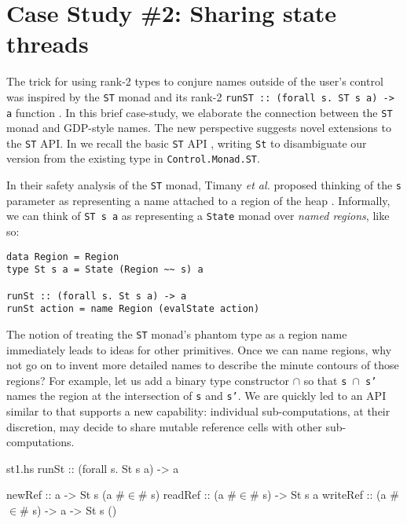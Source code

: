 \documentclass[format=sigplan, review=false, screen=true]{acmart}
\begin{document}

\section{Case Study \#2: Sharing state threads}
The trick for using rank-2 types to conjure names outside of the user's control was
inspired by the \texttt{ST} monad and its rank-2 \texttt{runST :: (forall s. ST s a) -> a}
function \cite{launchbury1994lazy}. In this brief case-study, we elaborate the connection
between the \texttt{ST} monad and GDP-style names. The new perspective suggests novel
extensions to the \texttt{ST} API.
In  we recall the basic \texttt{ST} API \cite{launchbury1994lazy}, writing \texttt{St} to
disambiguate our version from the existing type in \texttt{Control.Monad.ST}.

In their safety analysis of the \texttt{ST} monad, Timany \textit{et al.} proposed thinking of the \texttt{s} parameter as
representing a name attached to a region of the heap \cite{timany2017logical}.
Informally, we can think of \texttt{ST s a} as representing a \texttt{State} monad over
\emph{named regions}, like so:
\begin{verbatim}
data Region = Region
type St s a = State (Region ~~ s) a

runSt :: (forall s. St s a) -> a
runSt action = name Region (evalState action)
\end{verbatim}

The notion of treating the \texttt{ST} monad's phantom type as a region name immediately leads to ideas for
other primitives. Once we can name regions, why not go on to invent more detailed names to describe
the minute contours of those regions? For example, let us add a binary type constructor $\cap$ so that \texttt{s $\cap$ s'}
names the region at the intersection of \texttt{s} and \texttt{s'}. We are quickly led to an API similar to  that
supports a new capability: individual sub-computations, at their discretion, may decide to share mutable reference cells with other sub-computations.

\begin{filecontents*}{st1.hs}
runSt    :: (forall s. St s a) -> a

newRef   :: a -> St s (a #$\in$# s)
readRef  :: (a #$\in$# s) -> St s a
writeRef :: (a #$\in$# s) -> a -> St s ()
\end{filecontents*}
\end{document}
